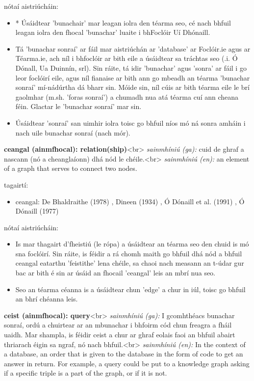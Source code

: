 \documentclass{article}
\begin{document}
nótaí aistriúcháin:
\begin{itemize}
	\item * Úsáidtear 'bunachair' mar leagan iolra den téarma seo, cé nach bhfuil leagan iolra den fhocal 'bunachar' luaite i bhFoclóir Uí Dhónaill.
	\item Tá 'bunachar sonraí' ar fáil mar aistriúchán ar 'database' ar Foclóir.ie agus ar Téarma.ie, ach níl i bhfoclóir ar bith eile a úsáidtear sa tráchtas seo (.i. Ó Dónall, Ua Duinnín, srl). Sin ráite, tá idir 'bunachar' agus 'sonra' ar fáil i go leor foclóirí eile, agus níl fianaise ar bith ann go mbeadh an téarma 'bunachar sonraí' mí-nádúrtha dá bharr sin. Móide sin, níl cúis ar bith téarma eile le brí gaolmhar (m.sh. 'foras sonraí') a chumadh nua atá téarma cuí ann cheana féin. Glactar le 'bunachar sonraí' mar sin.
	\item Úsáidtear 'sonraí' san uimhir iolra toisc go bhfuil níos mó ná sonra amháin i nach uile bunachar sonraí (nach mór).
\end{itemize}


\textbf{ceangal (ainmfhocal): relation(ship)}<br>
\textit{sainmhíniú (ga):} cuid de ghraf a nascann (nó a cheanglaíonn) dhá nód le chéile.<br>
\textit{sainmhíniú (en):} an element of a graph that serves to connect two nodes.

tagairtí:
\begin{itemize}
	\item ceangal: De Bhaldraithe (1978) \cite{de-bhaldraithe}, Dineen (1934) \cite{dineen}, Ó Dónaill et al. (1991) \cite{focloir-beag}, Ó Dónaill (1977) \cite{odonaill}
\end{itemize}

nótaí aistriúcháin:
\begin{itemize}
	\item Is mar thagairt d'fheistiú (le rópa) a úsáidtear an téarma seo den chuid is mó sna foclóirí. Sin ráite, is féidir a rá chomh maith go bhfuil dhá nód a bhfuil ceangal eatarthu 'feistithe' lena chéile, sa chaoi nach measann an t-údar gur bac ar bith é sin ar úsáid an fhocail 'ceangal' leis an mbrí nua seo.
	\item Seo an téarma céanna is a úsáidtear chun 'edge' a chur in iúl, toisc go bhfuil an bhrí chéanna leis.
\end{itemize}


\textbf{ceist (ainmfhocal): query}<br>
\textit{sainmhíniú (ga):} I gcomhthéacs bunachar sonraí, ordú a chuirtear ar an mbunachar i bhfoirm cód chun freagra a fháil uaidh. Mar shampla, is féidir ceist a chur ar ghraf eolais faoi an bhfuil abairt thriarach éigin sa ngraf, nó nach bhfuil.<br>
\textit{sainmhíniú (en):} In the context of a database, an order that is given to the database in the form of code to get an answer in return. For example, a query could be put to a knowledge graph asking if a specific triple is a part of the graph, or if it is not.
\end{document}
